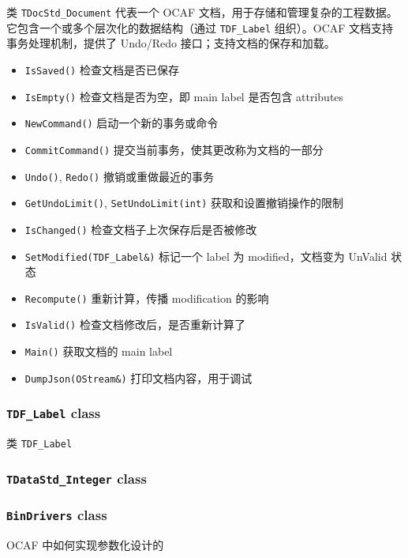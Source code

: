 \documentclass[11pt]{article}
\begin{document}
类 \texttt{TDocStd\_Document} 代表一个 OCAF 文档，用于存储和管理复杂的工程数据。它包含一个或多个层次化的数据结构（通过 \texttt{TDF\_Label} 组织）。OCAF 文档支持事务处理机制，提供了 Undo/Redo 接口；支持文档的保存和加载。

\begin{itemize}
\item \texttt{IsSaved()} 检查文档是否已保存
\item \texttt{IsEmpty()} 检查文档是否为空，即 main label 是否包含 attributes
\item \texttt{NewCommand()} 启动一个新的事务或命令
\item \texttt{CommitCommand()} 提交当前事务，使其更改称为文档的一部分
\item \texttt{Undo()}, \texttt{Redo()} 撤销或重做最近的事务
\item \texttt{GetUndoLimit()}, \texttt{SetUndoLimit(int)} 获取和设置撤销操作的限制
\item \texttt{IsChanged()} 检查文档子上次保存后是否被修改
\item \texttt{SetModified(TDF\_Label\&)} 标记一个 label 为 modified，文档变为 UnValid 状态
\item \texttt{Recompute()} 重新计算，传播 modification 的影响
\item \texttt{IsValid()} 检查文档修改后，是否重新计算了
\item \texttt{Main()} 获取文档的 main label
\item \texttt{DumpJson(OStream\&)} 打印文档内容，用于调试
\end{itemize}
\subsubsection{\texttt{TDF\_Label} class}
\label{sec:orga1bf3a1}

类 \texttt{TDF\_Label}
\subsubsection{\texttt{TDataStd\_Integer} class}
\label{sec:org2607b49}

\subsubsection{\texttt{BinDrivers} class}
\label{sec:org5266457}

OCAF 中如何实现参数化设计的
\end{document}

